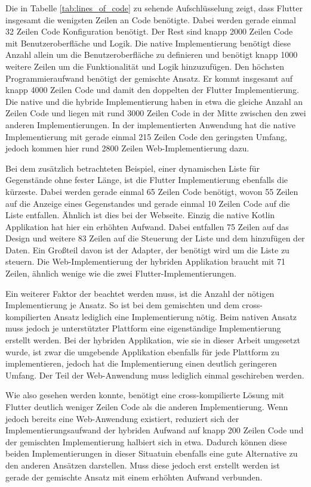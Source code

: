 Die in Tabelle \ref{tab:lines_of_code} zu sehende Aufschlüsselung zeigt, dass Flutter insgesamt die wenigsten Zeilen an Code benötigte. 
Dabei werden gerade einmal 32 Zeilen Code Konfiguration benötigt. 
Der Rest sind knapp 2000 Zeilen Code mit Benutzeroberfläche und Logik. Die native Implementierung benötigt diese Anzahl allein um die Benutzeroberfläche zu definieren und benötigt knapp 1000 weitere Zeilen um die Funktionalität und Logik hinzuzufügen. 
Den höchsten Programmieraufwand benötigt der gemischte Ansatz. Er kommt insgesamt auf knapp 4000 Zeilen Code und damit den doppelten der Flutter Implementierung. Die native und die hybride Implementierung haben in etwa die gleiche Anzahl an Zeilen Code und liegen mit rund 3000 Zeilen Code in der Mitte zwischen den zwei anderen Implementierungen.
In der implementierten Anwendung hat die native Implementierung mit gerade einmal 215 Zeilen Code den geringsten Umfang, jedoch kommen hier rund 2800 Zeilen Web-Implementierung dazu.

Bei dem zusätzlich betrachteten Beispiel, einer dynamischen Liste für Gegenstände ohne fester Länge, ist die Flutter Implementierung ebenfalls die kürzeste. Dabei werden gerade einmal 65 Zeilen Code benötigt, wovon 55 Zeilen auf die Anzeige eines Gegenstandes und gerade einmal 10 Zeilen Code auf die Liste entfallen. Ähnlich ist dies bei der Webseite. Einzig die native Kotlin Applikation hat hier ein erhöhten Aufwand. Dabei entfallen 75 Zeilen auf das Design und weitere 83 Zeilen auf die Steuerung der Liste und dem hinzufügen der Daten. Ein Großteil davon ist der Adapter, der benötigt wird um die Liste zu steuern. Die Web-Implementierung der hybriden Applikation braucht mit 71 Zeilen, ähnlich wenige wie die zwei Flutter-Implementierungen.

Ein weiterer Faktor der beachtet werden muss, ist die Anzahl der nötigen Implementierung je Ansatz. So ist bei dem gemischten und dem cross-kompilierten Ansatz lediglich eine Implementierung nötig. Beim nativen Ansatz muss jedoch je unterstützter Plattform eine eigenständige Implementierung erstellt werden. Bei der hybriden Applikation, wie sie in dieser Arbeit umgesetzt wurde, ist zwar die umgebende Applikation ebenfalls für jede Plattform zu implementieren, jedoch hat die Implementierung einen deutlich geringeren Umfang. Der Teil der Web-Anwendung muss lediglich einmal geschireben werden.  

Wie also gesehen werden konnte, benötigt eine cross-kompilierte Lösung mit Flutter deutlich weniger Zeilen Code als die anderen Implementierung.
Wenn jedoch bereits eine Web-Anwendung existiert, reduziert sich der Implementierungsaufwand der hybriden Aufwand auf knapp 200 Zeilen Code und der gemischten Implementierung halbiert sich in etwa. Dadurch können diese beiden Implementierungen in dieser Situatuin ebenfalls eine gute Alternative zu den anderen Ansätzen darstellen. Muss diese jedoch erst erstellt werden ist gerade der gemischte Ansatz mit einem erhöhten Aufwand verbunden.

